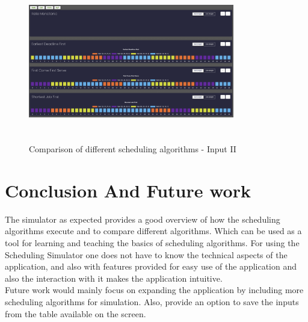 \documentclass[12pt, conference]{IEEEtran}
\begin{document}
\begin{figure}
\centerline{\includegraphics[width=9cm, height=7cm]{Result2.png}}
\caption{Comparison of different scheduling algorithms - Input II}
\label{comparison2}
\end{figure}


\section{Conclusion And Future work}
The simulator as expected provides a good overview of how the scheduling algorithms execute and to compare different algorithms. Which can be used as a tool for learning and teaching the basics of scheduling algorithms. For using the Scheduling Simulator one does not have to know the technical aspects of the application, and also with features provided for easy use of the application and also the interaction with it makes the application intuitive. \\
Future work would mainly focus on expanding the application by including more scheduling algorithms for simulation.  Also, provide an option to save the inputs from the table available on the screen.
\end{document}
